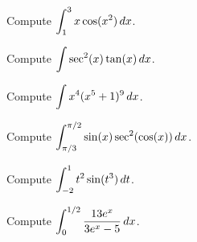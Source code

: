 \documentclass[10pt,t,handout,ignorenonframetext,aspectratio=169]{beamer}
\begin{document}
\begin{frame}
  \vs
  \begin{question}
    Compute $\displaystyle \int_1^3 x \cos(x^2) \mathop{}\!d x$.
  \end{question}
\end{frame}

\begin{frame}
  \vs
  \begin{question}
    Compute $\displaystyle \int \sec^2(x) \tan(x) \mathop{}\!d x$.
  \end{question}
\end{frame}


\begin{frame}
  \vs
  \begin{question}
    Compute $\displaystyle \int x^4(x^5+1)^9 \mathop{}\!d x$.
  \end{question}
\end{frame}

\begin{frame}
  \vs
  \begin{question}
    Compute $\displaystyle \int_{\pi/3}^{\pi/2} \sin(x) \sec^2(\cos(x)) \mathop{}\!d x$.
  \end{question}
\end{frame}


\begin{frame}
  \vs
  \begin{question}
    Compute $\displaystyle \int_{-2}^1 t^2 \sin(t^3) \mathop{}\!d t$.
  \end{question}
\end{frame}

\begin{frame}
  \vs
  \begin{question}
    Compute $\displaystyle \int_0^{1/2} \frac{13e^x}{3e^x-5} \mathop{}\!d x$.
  \end{question}
\end{frame}
\end{document}
